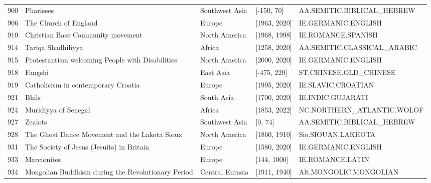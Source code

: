 {\begin{longtable}{rp{3.5cm}llp{3.5cm}}
900 & {\raggedright Pharisees} & Southwest Asia & [-150, 70] & {\raggedright AA.\allowbreak{}SEMITIC.\allowbreak{}BIBLICAL\_\allowbreak{}HEBREW} \\
906 & {\raggedright The Church of England} & Europe & [1963, 2020] & {\raggedright IE.\allowbreak{}GERMANIC.\allowbreak{}ENGLISH} \\
910 & {\raggedright Christian Base Community movement} & North America & [1968, 1998] & {\raggedright IE.\allowbreak{}ROMANCE.\allowbreak{}SPANISH} \\
914 & {\raggedright Tariqa Shadhiliyya} & Africa & [1258, 2020] & {\raggedright AA.\allowbreak{}SEMITIC.\allowbreak{}CLASSICAL\_\allowbreak{}ARABIC} \\
915 & {\raggedright Protestantism welcoming People with Disabilities} & North America & [2000, 2020] & {\raggedright IE.\allowbreak{}GERMANIC.\allowbreak{}ENGLISH} \\
918 & {\raggedright Fangshi} & East Asia & [-475, 220] & {\raggedright ST.\allowbreak{}CHINESE.\allowbreak{}OLD\_\allowbreak{}CHINESE} \\
919 & {\raggedright Catholicism in contemporary Croatia} & Europe & [1995, 2020] & {\raggedright IE.\allowbreak{}SLAVIC.\allowbreak{}CROATIAN} \\
921 & {\raggedright Bhils} & South Asia & [1700, 2020] & {\raggedright IE.\allowbreak{}INDIC.\allowbreak{}GUJARATI} \\
924 & {\raggedright Muridiyya of Senegal} & Africa & [1853, 2022] & {\raggedright NC.\allowbreak{}NORTHERN\_\allowbreak{}ATLANTIC.\allowbreak{}WOLOF} \\
927 & {\raggedright Zealots} & Southwest Asia & [0, 74] & {\raggedright AA.\allowbreak{}SEMITIC.\allowbreak{}BIBLICAL\_\allowbreak{}HEBREW} \\
928 & {\raggedright The Ghost Dance Movement and the Lakota Sioux} & North America & [1860, 1910] & {\raggedright Sio.\allowbreak{}SIOUAN.\allowbreak{}LAKHOTA} \\
931 & {\raggedright The Society of Jesus (Jesuits) in Britain} & Europe & [1580, 2020] & {\raggedright IE.\allowbreak{}GERMANIC.\allowbreak{}ENGLISH} \\
933 & {\raggedright Marcionites} & Europe & [144, 1000] & {\raggedright IE.\allowbreak{}ROMANCE.\allowbreak{}LATIN} \\
934 & {\raggedright Mongolian Buddhism during the Revolutionary Period} & Central Eurasia & [1911, 1940] & {\raggedright Alt.\allowbreak{}MONGOLIC.\allowbreak{}MONGOLIAN} \\

\end{longtable}}
